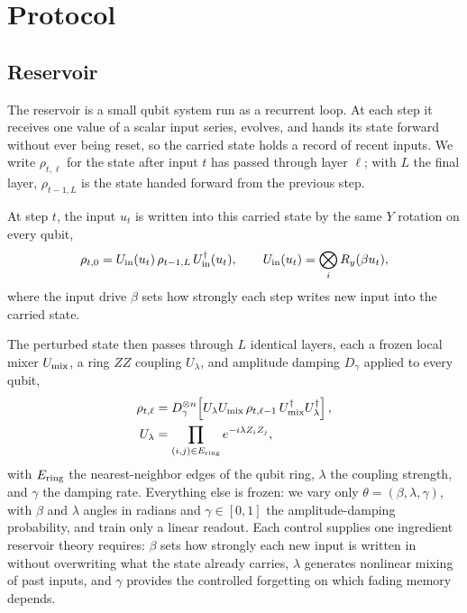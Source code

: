 \documentclass[10pt,conference]{IEEEtran}
\begin{document}
\section{Protocol}

\subsection{Reservoir}
The reservoir is a small qubit system run as a recurrent loop. At each step it receives one value of a scalar input series, evolves, and hands its state forward without ever being reset, so the carried state holds a record of recent inputs. We write $\rho_{t,\ell}$ for the state after input $t$ has passed through layer $\ell$; with $L$ the final layer, $\rho_{t-1,L}$ is the state handed forward from the previous step.

At step $t$, the input $u_t$ is written into this carried state by the same $Y$ rotation on every qubit,
\begin{equation}
\rho_{t,0}=U_{\rm in}(u_t)\,\rho_{t-1,L}\,U_{\rm in}^\dagger(u_t),
\qquad U_{\rm in}(u_t)=\bigotimes_i R_y(\beta u_t),
\end{equation}
where the input drive $\beta$ sets how strongly each step writes new input into the carried state.

The perturbed state then passes through $L$ identical layers, each a frozen local mixer $U_{\rm mix}$, a ring $ZZ$ coupling $U_\lambda$, and amplitude damping $D_\gamma$ applied to every qubit,
\begin{equation}
\begin{aligned}
\rho_{t,\ell}
&=D_\gamma^{\otimes n}\!\left[U_\lambda U_{\rm mix}\,\rho_{t,\ell-1}\,U_{\rm mix}^\dagger U_\lambda^\dagger\right],\\
U_\lambda
&=\prod_{(i,j)\in E_{\rm ring}} e^{-i\lambda Z_iZ_j},
\end{aligned}
\end{equation}
with $E_{\rm ring}$ the nearest-neighbor edges of the qubit ring, $\lambda$ the coupling strength, and $\gamma$ the damping rate. Everything else is frozen: we vary only $\theta=(\beta,\lambda,\gamma)$, with $\beta$ and $\lambda$ angles in radians and $\gamma\in[0,1]$ the amplitude-damping probability, and train only a linear readout. Each control supplies one ingredient reservoir theory requires: $\beta$ sets how strongly each new input is written in without overwriting what the state already carries, $\lambda$ generates nonlinear mixing of past inputs, and $\gamma$ provides the controlled forgetting on which fading memory depends.
\end{document}
